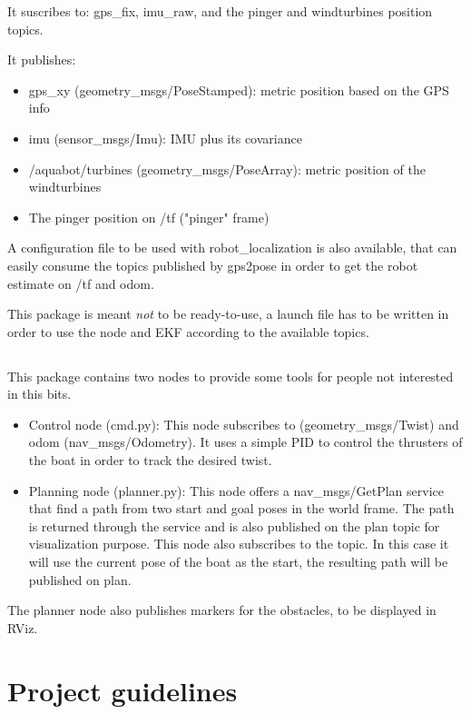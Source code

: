 \documentclass{ecnreport}
\begin{document}
It suscribes to: gps\_fix, imu\_raw, and the pinger and windturbines position topics.

It publishes:
\begin{itemize}
 \item gps\_xy (geometry\_msgs/PoseStamped): metric position based on the GPS info
\item imu (sensor\_msgs/Imu): IMU plus its covariance
\item /aquabot/turbines (geometry\_msgs/PoseArray): metric position of the windturbines
\item The pinger position on /tf ("pinger" frame)
\end{itemize}


A configuration file to be used with robot\_localization is also available, that can easily consume the topics published by gps2pose in order to get the robot estimate on /tf and odom.

This package is meant \emph{not} to be ready-to-use, a launch file has to be written in order to use the node and EKF according to the available topics.

\subsection{}

This package contains two nodes to provide some tools for people not interested in this bits.

\begin{itemize}
 \item Control node (cmd.py): This node subscribes to  (geometry\_msgs/Twist) and odom (nav\_msgs/Odometry). It uses a simple PID to control the thrusters of the boat in order to track the desired twist.
 \item Planning node (planner.py): This node offers a nav\_msgs/GetPlan service that find a path from two start and goal poses in the world
frame. The path is returned through the service and is also published on the plan topic for visualization purpose. This node also subscribes
to the  topic. In this case it will use the current pose of the boat as the start, the resulting path will be published on plan.
\end{itemize}

The planner node also publishes markers for the obstacles, to be displayed in RViz.



\section{Project guidelines}
\end{document}
